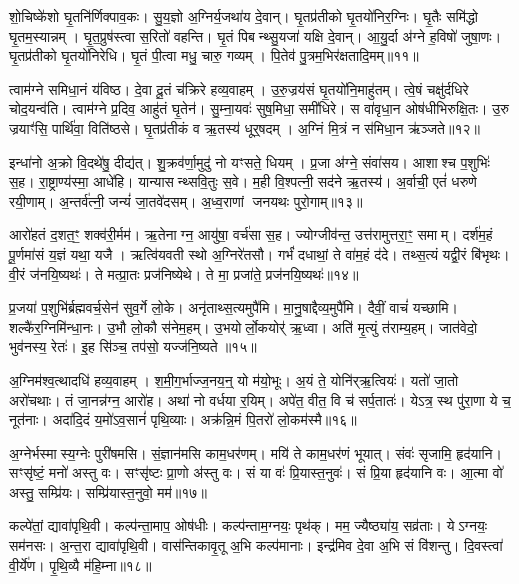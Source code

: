 शो॒चिष्के॑शो घृ॒तनि॑र्णिक्पाव॒कः।
सु॒य॒ज्ञो अ॒ग्निर्य॒जथा॑य दे॒वान्।
घृ॒तप्र॑तीको घृ॒तयो॑निर॒ग्निः।
घृ॒तैः समि॑द्धो घृ॒तम॒स्यान्नम्।
घृ॒त॒प्रुष॑स्त्वा स॒रितो॑ वहन्ति।
घृ॒तं पिबन्थ्सु॒यजा॑ यक्षि दे॒वान्।
आ॒यु॒र्दा अ॑ग्ने ह॒विषो॑ जुषा॒णः।
घृ॒तप्र॑तीको घृ॒तयो॑निरेधि।
घृ॒तं पी॒त्वा मधु॒ चारु॒ गव्यम्।
पि॒तेव॑ पु॒त्रम॒भिर॑क्षतादि॒मम्॥११॥

त्वाम॑ग्ने समिधा॒नं य॑विष्ठ।
दे॒वा दू॒तं च॑क्रिरे हव्य॒वाहम्।
उ॒रु॒ज्रय॑सं घृ॒तयो॑नि॒माहु॑तम्।
त्वे॒षं चक्षु॑र्दधिरे चोद॒यन्व॑ति।
त्वाम॑ग्ने प्र॒दिव॒ आहु॑तं घृ॒तेन॑।
सु॒म्ना॒यवः॑ सुष॒मिधा॒ समी॑धिरे।
स वा॑वृधा॒न ओष॑धीभिरुक्षि॒तः।
उ॒रु ज्रयाꣳ॑सि॒ पार्थि॑वा॒ विति॑ष्ठसे।
घृ॒तप्र॑तीकं व ऋ॒तस्य॑ धूर्॒षदम्।
अ॒ग्निं मि॒त्रं न स॑मिधा॒न ऋ॑ञ्जते॥१२॥

इन्धा॑नो अ॒क्रो वि॒दथे॑षु॒ दीद्य॑त्।
शु॒क्रव॑र्णा॒मुदु॑ नो यꣳसते॒ धियम्।
प्र॒जा अ॑ग्ने॒ संवा॑सय।
आशाश्च प॒शुभिः॑ स॒ह।
रा॒ष्ट्राण्य॑स्मा॒ आधे॑हि।
यान्यासन्थ्सवि॒तुः स॒वे।
म॒ही वि॒श्पत्नी॒ सद॑ने ऋ॒तस्य॑।
अ॒र्वाची॒ एतं॑ धरुणे रयी॒णाम्।
अ॒न्तर्व॑त्नी॒ जन्यं॑ जा॒तवे॑दसम्।
अ॒ध्व॒राणां जनयथः पुरो॒गाम्॥१३॥

आरो॑हतं द॒शत॒ꣳ॒ शक्व॑री॒र्मम॑।
ऋ॒तेनाग्न॒ आयु॑षा॒ वर्च॑सा स॒ह।
ज्योग्जीव॑न्त॒ उत्त॑रामुत्तरा॒ꣳ॒ समाम्।
दर्\mbox{}श॑म॒हं पू॒र्णमा॑सं य॒ज्ञं यथा॒ यजै।
ऋत्वि॑यवती स्थो अ॒ग्निरे॑तसौ।
गर्भं॑ दधाथां॒ ते वा॑म॒हं द॑दे।
तथ्स॒त्यं यद्वी॒रं बि॑भृथः।
वी॒रं ज॑नयि॒ष्यथः॑।
ते मत्प्रा॒तः प्रज॑निष्येथे।
ते मा॒ प्रजा॑ते॒ प्रज॑नयि॒ष्यथः॑॥१४॥

प्र॒जया॑ प॒शुभि॑र्ब्रह्मवर्च॒सेन॑ सुव॒र्गे लो॒के।
अनृ॑ताथ्स॒त्यमुपै॑मि।
मा॒नु॒षाद्दैव्य॒मुपै॑मि।
दैवीं॒ वाचं॑ यच्छामि।
शल्कै॑र॒ग्निमि॑न्धा॒नः।
उ॒भौ लो॒कौ स॑नेम॒हम्।
उ॒भयोर्लो॒कयोर्॑ ऋ॒ध्वा।
अति॑ मृ॒त्युं त॑राम्य॒हम्।
जात॑वेदो॒ भुव॑नस्य॒ रेतः॑।
इ॒ह सि॑ञ्च॒ तप॑सो॒ यज्ज॑नि॒ष्यते॥१५॥

अ॒ग्निम॑श्व॒त्थादधि॑ हव्य॒वाहम्।
श॒मी॒ग॒र्भाज्ज॒नय॒न्॒ यो म॑यो॒भूः।
अ॒यं ते॒ योनि॑र्‌\mbox{}ऋ॒त्वियः॑।
यतो॑ जा॒तो अरो॑चथाः।
तं जा॒नन्न॑ग्न॒ आरो॑ह।
अथा॑ नो वर्धया र॒यिम्।
अपे॑त॒ वीत॒ वि च॑ सर्प॒तातः॑।
येऽत्र॒ स्थ पु॑रा॒णा ये च॒ नूत॑नाः।
अदा॑दि॒दं य॒मो॑\-ऽव॒सानं॑ पृथि॒व्याः।
अक्र॑न्नि॒मं पि॒तरो॑ लो॒कम॑स्मै॥१६॥

अ॒ग्नेर्भस्मास्य॒ग्नेः पुरी॑षमसि।
सं॒ज्ञान॑मसि काम॒धर॑णम्।
मयि॑ ते काम॒धर॑णं भूयात्।
संवः॑ सृजामि॒ हृद॑यानि।
सꣳसृ॑ष्टं॒ मनो॑ अस्तु वः।
सꣳसृ॑ष्टः प्रा॒णो अ॑स्तु वः।
सं या वः॑ प्रि॒यास्त॒नुवः॑।
सं प्रि॒या हृद॑यानि वः।
आ॒त्मा वो॑ अस्तु॒ सम्प्रि॑यः।
सम्प्रि॑यास्त॒नुवो॒ मम॑॥१७॥

कल्पे॑तां॒ द्यावा॑पृथि॒वी।
कल्प॑न्ता॒माप॒ ओष॑धीः।
कल्प॑न्ताम॒ग्नयः॒ पृथ॑क्।
मम॒ ज्यैष्ठ्या॑य॒ सव्र॑ताः।
येऽग्नयः॒ सम॑नसः।
अ॒न्त॒रा द्यावा॑पृथि॒वी।
वास॑न्तिकावृ॒तू अ॒भि कल्प॑मानाः।
इन्द्र॑मिव दे॒वा अ॒भि सं वि॑शन्तु।
दि॒वस्त्वा॑ वी॒र्ये॑ण।
पृ॒थि॒व्यै म॑हि॒म्ना॥१८॥

